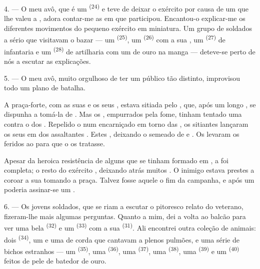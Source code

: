 \VUsaut{4.0mm}
\VUsaut{2.8mm}

4. --- O meu avô, que é um  \textsuperscript{(24)} e
teve de deixar o exército por causa de um  que lhe valeu
a , adora contar-me as  em que
participou. Encantou-o explicar-me os diferentes movimentos do pequeno
exército em miniatura. Um grupo de soldados a sério que visitavam o bazar
--- um  \textsuperscript{(25)}, um  \textsuperscript{(26)} com a sua , um 
\textsuperscript{(27)} de infantaria e um  \textsuperscript{(28)} de
artilharia com um  de ouro na manga --- deteve-se perto de
nós a escutar as explicações.

5. --- O meu avô, muito orgulhoso de ter um público tão distinto,
improvisou todo um plano de batalha.

A praça-forte, com as suas  e os seus ,
estava sitiada pelo , que, após um longo
, se dispunha a tomá-la de . Mas os
, empurrados pela fome, tinham tentado uma 
contra o  dos . Repelido o
 num encarniçado  em torno das
, os sitiantes  lançaram os seus
 em  dos assaltantes
. Estes , deixando o  semeado de  e . Os
 levaram os feridos ao  para
que o  os tratasse.

Apesar da heroica resistência de alguns  que se tinham
formado em , a  foi completa; o resto do
exército , deixando atrás muitos . O
inimigo estava prestes a coroar a sua  tomando a praça.
Talvez fosse aquele o fim da campanha, e após um 
poderia assinar-se um .

\VUsaut{4.4mm}
\VUsaut{2.8mm}

6. --- Os jovens soldados, que se riam a escutar o pitoresco relato do
veterano, fizeram-lhe mais algumas perguntas. Quanto a mim, dei a volta ao
balcão para ver uma bela  \textsuperscript{(32)} e um 
\textsuperscript{(33)} com a sua  \textsuperscript{(31)}. Ali encontrei
outra coleção de animais: dois  \textsuperscript{(34)}, um
 e uma  de corda que cantavam a plenos
pulmões, e uma série de bichos estranhos --- um 
\textsuperscript{(35)}, uma  \textsuperscript{(36)}, uma 
\textsuperscript{(37)}, uma  \textsuperscript{(38)}, uma 
\textsuperscript{(39)} e um  \textsuperscript{(40)} feitos de pele de
batedor de ouro.

